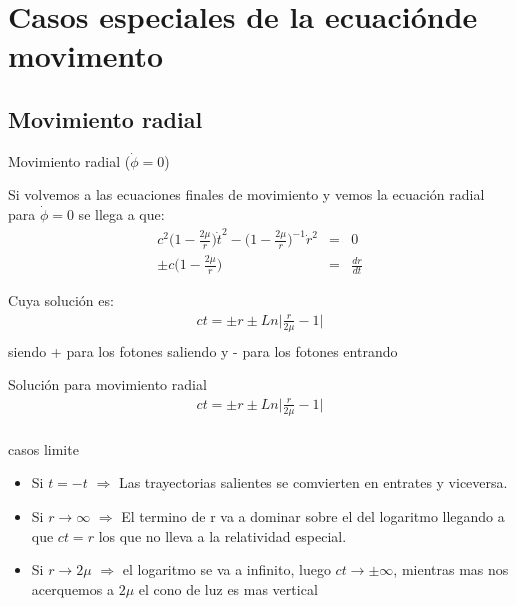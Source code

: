 \documentclass[xcolor=dvipsnames]{beamer}
\begin{document}
\section{Casos especiales de la ecuaciónde movimento}
  \subsection{Movimiento radial}
    \begin{frame}{Movimiento radial ($\dot{\phi}=0$)}
    \begin{block}{}
     Si volvemos a las ecuaciones finales de movimiento y vemos la ecuación radial para $\dot{\phi}=0$ se llega a que:
  \begin{eqnarray*}
       c^{2}\Big( 1- \frac{2\mu}{r}\Big) \dot{t}^{2}-\Big( 1- \frac{2\mu}{r}\Big)^{-1} \dot{r}^{2}&=&0\\
       \pm  c\Big( 1- \frac{2\mu}{r}\Big)&=&\frac{dr}{dt}
 \end{eqnarray*}
      \end{block}
      \begin{block}{}
    Cuya solución es:
  \begin{eqnarray*}
       ct=\pm r\pm Ln\Big| \frac{r}{2\mu}-1 \Big|\\
 \end{eqnarray*}
 siendo + para los fotones saliendo y - para los fotones entrando
      \end{block}
  \end{frame}


\begin{frame}{}

     
      \begin{block}{Solución para movimiento radial}
  \begin{eqnarray*}
       ct=\pm r\pm Ln\Big| \frac{r}{2\mu}-1 \Big|\\
 \end{eqnarray*}
 
   \end{block}
    \begin{block}{casos limite}
    \begin{itemize}
        \item Si $t=-t$ $\Rightarrow$ Las trayectorias salientes se comvierten en entrates y viceversa.
        \item Si $r\rightarrow \infty$ $\Rightarrow$ El termino de r va a dominar sobre el del logaritmo llegando a que $ct=r$ los que no lleva a la relatividad especial.
        \item Si $r\rightarrow 2\mu$ $\Rightarrow$ el logaritmo se va a infinito, luego $ct\rightarrow \pm \infty$, mientras mas nos acerquemos a $2\mu$ el cono de luz es mas vertical 
    \end{itemize}
      \end{block}
  \end{frame}
\end{document}
